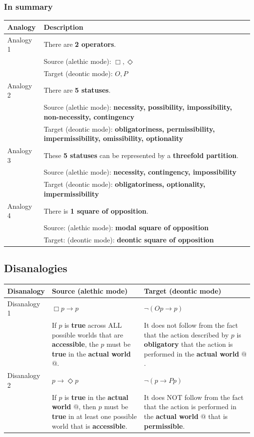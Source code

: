 \documentclass[11pt]{article}
\begin{document}
\subsubsection{In summary}
\label{sec:orgb44afbb}
\begin{center}
\begin{tabular}{|m{5em}|m{25em}|}
\hline
Analogy & Description\\
\hline
Analogy 1 & There are \textbf{2 operators}.\\
 & Source (alethic mode): \(\Box, \Diamond\)\\
 & Target (deontic mode): \(O, P\)\\
\hline
Analogy 2 & There are \textbf{5 statuses}.\\
 & Source (alethic mode): \textbf{necessity, possibility, impossibility, non-necessity, contingency}\\
 & Target (deontic mode): \textbf{obligatoriness, permissibility, impermissibility, omissibility, optionality}\\
\hline
Analogy 3 & These \textbf{5 statuses} can be represented by a \textbf{threefold partition}.\\
 & Source (alethic mode): \textbf{necessity, contingency, impossibility}\\
 & Target (deontic mode): \textbf{obligatoriness, optionality, impermissibility}\\
\hline
Analogy 4 & There is \textbf{1 square of opposition}.\\
 & Source: (alethic mode): \textbf{modal square of opposition}\\
 & Target: (deontic mode): \textbf{deontic square of opposition}\\
\hline
\end{tabular}
\end{center}
\subsection{Disanalogies}
\label{sec:org456f585}
\begin{center}
\begin{tabularx}{\textwidth}{|X|X|X|}
\hline
Disanalogy & Source (alethic mode) & Target (deontic mode)\\
\hline
Disanalogy 1 & \(\Box p \rightarrow p\) & \(\neg (Op \rightarrow p)\)\\
 & If \(p\) is \textbf{true} across ALL possible worlds that are \textbf{accessible}, the \(p\) must be \textbf{true} in the \textbf{actual world} \(@\). & It does not follow from the fact that the action described by \(p\) is \textbf{obligatory} that the action is performed in the \textbf{actual world} \(@\).\\
\hline
Disanalogy 2 & \(p \rightarrow \Diamond p\) & \(\neg (p \rightarrow Pp)\)\\
 & If \(p\) is \textbf{true} in the \textbf{actual world} \(@\), then \(p\) must be \textbf{true} in at least one possible world that is \textbf{accessible}. & It does NOT follow from the fact that the action is performed in the \textbf{actual world} \(@\) that is \textbf{permissible}.\\
\hline
\end{tabularx}
\end{center}
\end{document}
